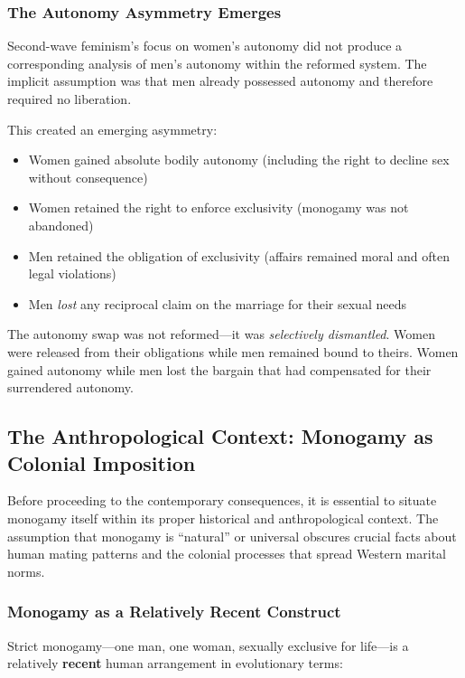 \documentclass[12pt, letterpaper]{article}
\begin{document}
\subsubsection{The Autonomy Asymmetry Emerges}

Second-wave feminism's focus on women's autonomy did not produce a corresponding analysis of men's autonomy within the reformed system. The implicit assumption was that men already possessed autonomy and therefore required no liberation.

This created an emerging asymmetry:

\begin{itemize}
    \item Women gained absolute bodily autonomy (including the right to decline sex without consequence)
    \item Women retained the right to enforce exclusivity (monogamy was not abandoned)
    \item Men retained the obligation of exclusivity (affairs remained moral and often legal violations)
    \item Men \textit{lost} any reciprocal claim on the marriage for their sexual needs
\end{itemize}

The autonomy swap was not reformed---it was \textit{selectively dismantled}. Women were released from their obligations while men remained bound to theirs. Women gained autonomy while men lost the bargain that had compensated for their surrendered autonomy.

\subsection{The Anthropological Context: Monogamy as Colonial Imposition}

Before proceeding to the contemporary consequences, it is essential to situate monogamy itself within its proper historical and anthropological context. The assumption that monogamy is ``natural'' or universal obscures crucial facts about human mating patterns and the colonial processes that spread Western marital norms.

\subsubsection{Monogamy as a Relatively Recent Construct}

Strict monogamy---one man, one woman, sexually exclusive for life---is a relatively \textbf{recent} human arrangement in evolutionary terms:
\end{document}

